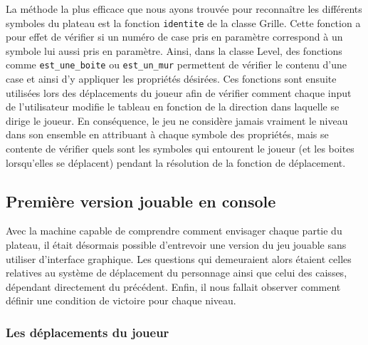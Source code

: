 \documentclass[a4paper,12pt]{article} %
\begin{document}
La méthode la plus efficace que nous ayons trouvée pour reconnaître les différents symboles du plateau est la fonction \texttt{identite} de la classe Grille. Cette fonction a pour effet de vérifier si un numéro de case pris en paramètre correspond à un symbole lui aussi pris en paramètre. Ainsi, dans la classe Level, des fonctions comme \texttt{est\_une\_boite} ou \texttt{est\_un\_mur} permettent de vérifier le contenu d'une case et ainsi d'y appliquer les propriétés désirées. Ces fonctions sont ensuite utilisées lors des déplacements du joueur afin de vérifier comment chaque input de l'utilisateur modifie le tableau en fonction de la direction dans laquelle se dirige le joueur. En conséquence, le jeu ne considère jamais vraiment le niveau dans son ensemble en attribuant à chaque symbole des propriétés, mais se contente de vérifier quels sont les symboles qui entourent le joueur (et les boites lorsqu'elles se déplacent) pendant la résolution de la fonction de déplacement.

\subsection{Première version jouable en console}

Avec la machine capable de comprendre comment envisager chaque partie du plateau, il était désormais possible d'entrevoir une version du jeu jouable sans utiliser d'interface graphique. Les questions qui demeuraient alors étaient celles relatives au système de déplacement du personnage ainsi que celui des caisses, dépendant directement du précédent. Enfin, il nous fallait observer comment définir une condition de victoire pour chaque niveau.

\subsubsection{Les déplacements du joueur}
\end{document}

